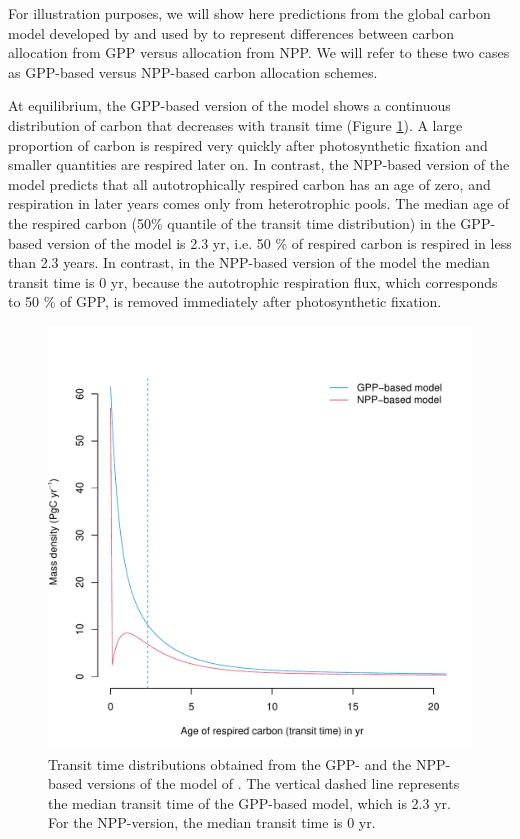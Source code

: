 \documentclass[bg, manuscript]{copernicus}
\begin{document}
For illustration purposes, we will show here predictions from the global carbon model developed by \citet{Emanuel1981} and used by \citet{Thompson1999} to represent differences between carbon allocation from GPP versus allocation from NPP. We will refer to these two cases as GPP-based versus NPP-based carbon allocation schemes. 

At equilibrium, the GPP-based version of the model shows a continuous distribution of carbon that decreases with transit time (Figure \ref{fig:GPPversusNPP}). A large proportion of carbon is respired very quickly after photosynthetic fixation and smaller quantities are respired later on. In contrast, the NPP-based version of the model predicts that all autotrophically respired carbon has an age of zero, and respiration in later years comes only from heterotrophic pools. The median age of the respired carbon (50\% quantile of the transit time distribution) in the GPP-based version of the model is 2.3 yr, i.e. 50 \% of respired carbon is respired in less than 2.3 years. In contrast, in the NPP-based version of the model the median transit time is 0 yr, because the autotrophic respiration flux, which corresponds to 50 \% of GPP, is removed immediately after photosynthetic fixation. 

\begin{figure}[t]
   \centering
   \includegraphics[scale=0.9]{GPPversusNPP_TT.pdf} %
   \caption{Transit time distributions obtained from the GPP- and the NPP-based versions of the model of \citet{Emanuel1981}. The vertical dashed line represents the median transit time of the GPP-based model, which is 2.3 yr. For the NPP-version, the median transit time is 0 yr. }
   \label{fig:GPPversusNPP}
\end{figure}
\end{document}
